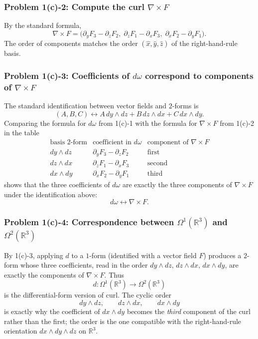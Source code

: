 \documentclass[11pt]{article}
\newcommand{\R}{\mathbb{R}}
\newcommand{\pd}{\partial}
\newcommand{\Om}{\Omega}
\begin{document}
\subsubsection*{Problem 1(c)-2: Compute the curl $\nabla\times F$}

By the standard formula,
\[
 \nabla\times F
 =
 \bigl(
 \pd_yF_3-\pd_zF_2,\;
 \pd_zF_1-\pd_xF_3,\;
 \pd_xF_2-\pd_yF_1
 \bigr).
\]
The order of components matches the order $(\hat x,\hat y,\hat z)$ of the right-hand-rule basis.

\subsubsection*{Problem 1(c)-3: Coefficients of $d\omega$ correspond to components of $\nabla\times F$}

The standard identification between vector fields and $2$-forms is
\[
 (A,B,C)
 \longleftrightarrow
 A\,dy\wedge dz+B\,dz\wedge dx+C\,dx\wedge dy.
\]
Comparing the formula for $d\omega$ from 1(c)-1 with the formula for $\nabla\times F$ from 1(c)-2 in the table
\[
\begin{array}{c|c|c}
\text{basis }2\text{-form} & \text{coefficient in }d\omega & \text{component of }\nabla\times F\\ \hline
dy\wedge dz & \pd_yF_3-\pd_zF_2 & \text{first}\\
dz\wedge dx & \pd_zF_1-\pd_xF_3 & \text{second}\\
dx\wedge dy & \pd_xF_2-\pd_yF_1 & \text{third}
\end{array}
\]
shows that the three coefficients of $d\omega$ are exactly the three components of $\nabla\times F$ under the identification above:
\[
 d\omega
 \longleftrightarrow
 \nabla\times F.
\]

\subsubsection*{Problem 1(c)-4: Correspondence between $\Omega^1(\R^3)$ and $\Omega^2(\R^3)$}

By 1(c)-3, applying $d$ to a $1$-form (identified with a vector field $F$) produces a $2$-form whose three coefficients, read in the order $dy\wedge dz,\,dz\wedge dx,\,dx\wedge dy$, are exactly the components of $\nabla\times F$. Thus
\[
 d:\Om^1(\R^3)\longrightarrow \Om^2(\R^3)
\]
is the differential-form version of curl. The cyclic order
\[
 dy\wedge dz,\qquad dz\wedge dx,\qquad dx\wedge dy
\]
is exactly why the coefficient of $dx\wedge dy$ becomes the \emph{third} component of the curl rather than the first; the order is the one compatible with the right-hand-rule orientation $dx\wedge dy\wedge dz$ on $\R^3$.
\end{document}
